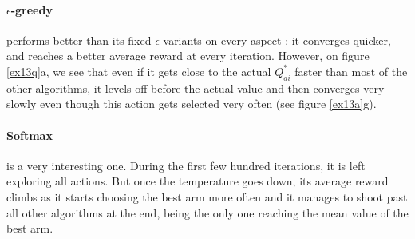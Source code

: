 \documentclass[a4paper]{article}
\begin{document}
\paragraph{$\epsilon$-greedy} performs better than its fixed $\epsilon$ variants
on every aspect : it converges quicker, and reaches a better average reward
at every iteration. However, on figure \ref{ex13q}a, we see that even if 
it gets close to the actual $Q^*_{ai}$ faster than most of the other algorithms,
it levels off before the actual value and then converges very slowly even though
this action gets selected very often (see figure \ref{ex13a}g).

\paragraph{Softmax} is a very interesting one. During the first few hundred
iterations, it is left exploring all actions. But once the temperature goes
down, its average reward climbs as it starts choosing the best arm more often
and it manages to shoot past all other algorithms at the end, being the only
one reaching the mean value of the best arm.
\end{document}
